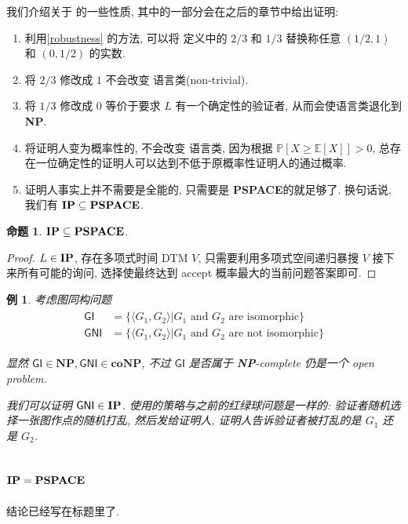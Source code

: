 \documentclass[8pt]{article}
\theoremstyle{compact}
\newtheorem{proposition}{命题}[section]
\newtheorem{example}{例}[section]
\def\ge{\geqslant}
\def\NP{\textbf{NP}}
\def\coNP{\textbf{coNP}}
\def\PSPACE{\textbf{PSPACE}}
\begin{document}
我们介绍关于 \IP 的一些性质, 其中的一部分会在之后的章节中给出证明:
\begin{enumerate}
	\item 利用\cref{robustness} 的方法, 可以将 \IP 定义中的 $2/3$ 和 $1/3$ 替换称任意 $(1/2, 1)$ 和 $(0, 1/2)$ 的实数.
	\item 将 $2/3$ 修改成 $1$ 不会改变 \IP 语言类(non-trivial).
	\item 将 $1/3$ 修改成 $0$ 等价于要求 $L$ 有一个确定性的验证者, 从而会使语言类退化到 \NP.
 \item 将证明人变为概率性的, 不会改变 \IP 语言类, 因为根据 $\mathbb P[X \ge \mathbb E[X]] > 0$, 总存在一位确定性的证明人可以达到不低于原概率性证明人的通过概率.
 \item 证明人事实上并不需要是全能的, 只需要是 \PSPACE 的就足够了. 换句话说, 我们有 $\IP \subseteq \PSPACE$.
\end{enumerate}

\begin{proposition}
	$\IP \subseteq \PSPACE$.
\end{proposition}
\begin{proof}
	$L \in \textbf{IP}$, 存在多项式时间 DTM $V$, 只需要利用多项式空间递归暴搜 $V$ 接下来所有可能的询问, 选择使最终达到 accept 概率最大的当前问题答案即可.
\end{proof}

\begin{example} 考虑图同构问题
\begin{align*}
	\begin{split}
		\textsf{GI} &= \{\langle G_1, G_2 \rangle | G_1 \text{ and } G_2 \text{ are isomorphic}\} \\
		\textsf{GNI} &= \{\langle G_1, G_2 \rangle | G_1 \text{ and } G_2 \text{ are not isomorphic}\}
	\end{split}
\end{align*}

显然 $\textsf{GI} \in \NP, \textsf{GNI} \in \coNP$, 不过 $\textsf{GI}$ 是否属于 \NP-complete 仍是一个 open problem.

我们可以证明 $\textsf{GNI} \in \textbf{IP}$. 使用的策略与之前的红绿球问题是一样的: 验证者随机选择一张图作点的随机打乱, 然后发给证明人, 证明人告诉验证者被打乱的是 $G_1$ 还是 $G_2$.

\end{example}

\subsection{$\IP = \PSPACE$}
结论已经写在标题里了.
\end{document}
